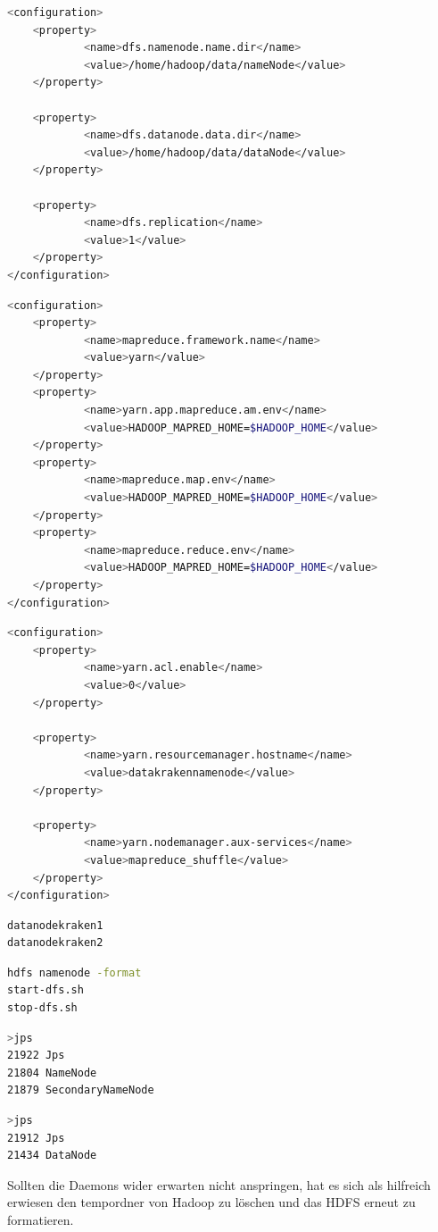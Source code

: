 \documentclass[12pt,oneside,a4paper,parskip]{scrbook}
\begin{document}
\begin{lstlisting}[caption=hadoop/etc/hadoop/hdfs-site.xml,label=hdfssitexml,language=bash]
<configuration>
    <property>
            <name>dfs.namenode.name.dir</name>
            <value>/home/hadoop/data/nameNode</value>
    </property>

    <property>
            <name>dfs.datanode.data.dir</name>
            <value>/home/hadoop/data/dataNode</value>
    </property>

    <property>
            <name>dfs.replication</name>
            <value>1</value>
    </property>
</configuration>
\end{lstlisting}\begin{lstlisting}[caption=/hadoop/etc/hadoop/mapred-site.xml,label=mapredsitexml,language=bash]
<configuration>
    <property>
            <name>mapreduce.framework.name</name>
            <value>yarn</value>
    </property>
    <property>
            <name>yarn.app.mapreduce.am.env</name>
            <value>HADOOP_MAPRED_HOME=$HADOOP_HOME</value>
    </property>
    <property>
            <name>mapreduce.map.env</name>
            <value>HADOOP_MAPRED_HOME=$HADOOP_HOME</value>
    </property>
    <property>
            <name>mapreduce.reduce.env</name>
            <value>HADOOP_MAPRED_HOME=$HADOOP_HOME</value>
    </property>
</configuration>
\end{lstlisting}
\begin{lstlisting}[caption=/hadoop/etc/hadoop/yarn-site.xml,label=yarnsitexml,language=bash]
<configuration>
    <property>
            <name>yarn.acl.enable</name>
            <value>0</value>
    </property>

    <property>
            <name>yarn.resourcemanager.hostname</name>
            <value>datakrakennamenode</value>
    </property>

    <property>
            <name>yarn.nodemanager.aux-services</name>
            <value>mapreduce_shuffle</value>
    </property>
</configuration>

\end{lstlisting}
\begin{lstlisting}[caption=/hadoop/etc/hadoop/workers,label=workers,language=bash]
datanodekraken1
datanodekraken2
\end{lstlisting}
\begin{lstlisting}[caption=Formatieren des HDFS und Start/Stop,label=start,language=bash]
hdfs namenode -format
start-dfs.sh
stop-dfs.sh
\end{lstlisting}
\begin{lstlisting}[caption=Check ob daemon auf datakrakennamenode läuft,label=jpsnamenode,language=bash] %hier noch orginal von cmd einfügen
>jps
21922 Jps
21804 NameNode
21879 SecondaryNameNode
\end{lstlisting}
\begin{lstlisting}[caption=Check ob daemon auf den workern läuft,label=jpsworker,language=bash]
>jps
21912 Jps
21434 DataNode
\end{lstlisting}
Sollten die Daemons wider erwarten nicht anspringen, hat es sich als hilfreich erwiesen den tempordner von Hadoop zu löschen und das HDFS erneut zu formatieren.
\end{document}
